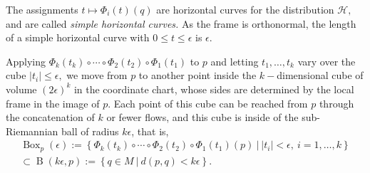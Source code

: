 \documentclass[12pt, letterpaper, reqno]{amsart}
\theoremstyle{definition}
\theoremstyle{plain}
\theoremstyle{remark}
\begin{document}
The assignments $ t\mapsto \Phi_i(t)(q) $ are horizontal curves for the distribution $ \mathcal{H}, $ and are called \textit{simple horizontal curves.} As the frame is orthonormal, the length of a simple horizontal curve with $ 0\leq t\leq \epsilon  $ is $ \epsilon. $   

Applying $ \Phi_k(t_k)\circ\cdots\circ \Phi_2(t_2)\circ\Phi_1(t_1)$ to $ p $ and letting $ t_1,\dots,t_k $ vary over the cube $ |t_i|\leq\epsilon, $ we move from $ p $ to another point inside the $ k- $dimensional  cube of volume $ (2\epsilon)^k$ in the coordinate chart, whose sides are determined by the local frame in the image of $ p $. Each point of this cube can be reached from $ p $ through the concatenation of $ k $ or fewer flows, and this cube is inside of the sub-Riemannian ball of radius $ k\epsilon $, that is,
\begin{align*}
 \operatorname{Box}_p(\epsilon):= \left\{ \Phi_k(t_k)\circ\cdots\circ \Phi_2(t_2)\circ\Phi_1(t_1)(p) \ | \ |t_i|<\epsilon, \ i=1,\dots,k \right\}\\ \subset \operatorname{B}(k\epsilon, p):= \left\{ q\in M \ | \ d(p,q)<k\epsilon \right\}.  
\end{align*}
\end{document}
